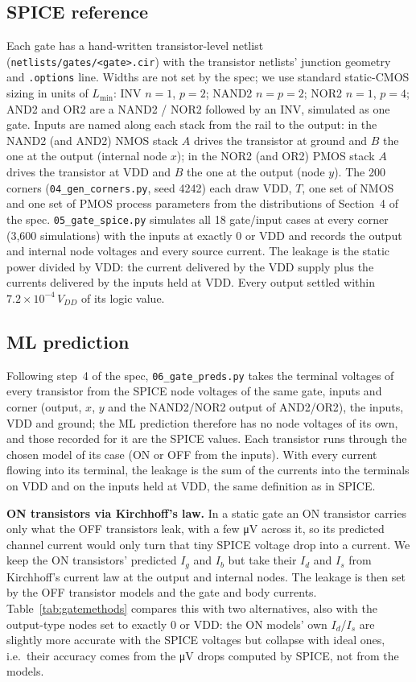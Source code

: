 \documentclass[11pt,a4paper]{article}
\begin{document}
\subsection{SPICE reference}
Each gate has a hand-written transistor-level netlist (\texttt{netlists/gates/<gate>.cir}) with the
transistor netlists' junction geometry and \texttt{.options} line. Widths are not set by the spec;
we use standard static-CMOS sizing in units of $L_{\min}$: INV $n=1$, $p=2$; NAND2 $n=p=2$; NOR2 $n=1$,
$p=4$; AND2 and OR2 are a NAND2 / NOR2 followed by an INV, simulated as one gate. Inputs are named
along each stack from the rail to the output: in the NAND2 (and AND2) NMOS stack $A$ drives the
transistor at ground and $B$ the one at the output (internal node $x$); in the NOR2 (and OR2) PMOS stack
$A$ drives the transistor at VDD and $B$ the one at the output (node $y$).
The 200 corners (\texttt{04\_gen\_corners.py}, seed 4242) each draw VDD, $T$, one set of NMOS and one
set of PMOS process parameters from the distributions of Section~4 of the spec. \texttt{05\_gate\_spice.py}
simulates all 18 gate/input cases at every corner (3{,}600 simulations) with the inputs at exactly 0 or
VDD and records the output and internal node voltages and every source current. The leakage is the
static power divided by VDD: the current delivered by the VDD supply plus the currents delivered by the
inputs held at VDD. Every output settled within $7.2\times10^{-4}\,V_{DD}$ of its logic value.

\subsection{ML prediction}
Following step~4 of the spec, \texttt{06\_gate\_preds.py} takes the terminal voltages of every
transistor from the SPICE node voltages of the same gate, inputs and corner (output, $x$, $y$ and the
NAND2/NOR2 output of AND2/OR2), the inputs, VDD and ground; the ML prediction therefore has no node
voltages of its own, and those recorded for it are the SPICE values. Each transistor runs through the
chosen model of its case (ON or OFF from the inputs). With every current flowing into its terminal, the
leakage is the sum of the currents into the terminals on VDD and on the inputs held at VDD, the same
definition as in SPICE.

\textbf{ON transistors via Kirchhoff's law.} In a static gate an ON transistor carries only what the
OFF transistors leak, with a few \si{\micro V} across it, so its predicted channel current would only
turn that tiny SPICE voltage drop into a current. We keep the ON transistors' predicted $I_g$ and $I_b$
but take their $I_d$ and $I_s$ from Kirchhoff's current law at the output and internal nodes. The
leakage is then set by the OFF transistor models and the gate and body currents.
Table~\ref{tab:gatemethods} compares this with two alternatives, also with the output-type nodes set to
exactly 0 or VDD: the ON models' own $I_d$/$I_s$ are slightly more accurate with the SPICE voltages but
collapse with ideal ones, i.e.\ their accuracy comes from the \si{\micro V} drops computed by SPICE, not
from the models.
\end{document}
